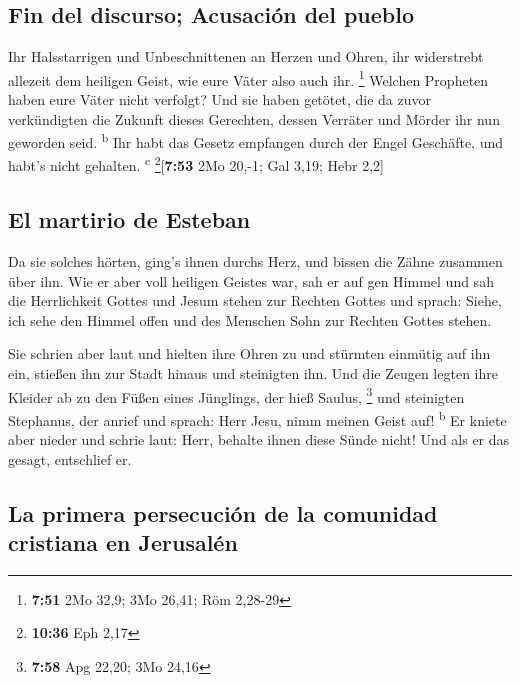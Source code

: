 \hypertarget{fin-del-discurso-acusaciuxf3n-del-pueblo}{%
\subsection{Fin del discurso; Acusación del
pueblo}\label{fin-del-discurso-acusaciuxf3n-del-pueblo}}

 Ihr Halsstarrigen und Unbeschnittenen an Herzen und
Ohren, ihr widerstrebt allezeit dem heiligen Geist, wie eure Väter also
auch ihr. \footnote{\textbf{7:51} 2Mo 32,9; 3Mo 26,41; Röm 2,28-29}
 Welchen Propheten haben eure Väter nicht verfolgt? Und
sie haben getötet, die da zuvor verkündigten die Zukunft dieses
Gerechten, dessen Verräter und Mörder ihr nun geworden seid.
\textsuperscript{b}  Ihr habt das Gesetz empfangen durch
der Engel Geschäfte, und habt's nicht gehalten. \textsuperscript{c}
\footnote{\textbf{10:36} Eph 2,17}{[}\textbf{7:53} 2Mo 20,-1; Gal 3,19;
Hebr 2,2{]}

\hypertarget{el-martirio-de-esteban}{%
\subsection{El martirio de Esteban}\label{el-martirio-de-esteban}}

 Da sie solches hörten, ging's ihnen durchs Herz, und
bissen die Zähne zusammen über ihn.  Wie er aber voll
heiligen Geistes war, sah er auf gen Himmel und sah die Herrlichkeit
Gottes und Jesum stehen zur Rechten Gottes  und sprach:
Siehe, ich sehe den Himmel offen und des Menschen Sohn zur Rechten
Gottes stehen.

 Sie schrien aber laut und hielten ihre Ohren zu und
stürmten einmütig auf ihn ein, stießen ihn zur Stadt hinaus und
steinigten ihn.  Und die Zeugen legten ihre Kleider ab zu
den Füßen eines Jünglings, der hieß Saulus, \footnote{\textbf{7:58} Apg
  22,20; 3Mo 24,16}  und steinigten Stephanus, der anrief
und sprach: Herr Jesu, nimm meinen Geist auf! \textsuperscript{b}
 Er kniete aber nieder und schrie laut: Herr, behalte
ihnen diese Sünde nicht! Und als er das gesagt, entschlief er.

\hypertarget{la-primera-persecuciuxf3n-de-la-comunidad-cristiana-en-jerusaluxe9n}{%
\subsection{La primera persecución de la comunidad cristiana en
Jerusalén}\label{la-primera-persecuciuxf3n-de-la-comunidad-cristiana-en-jerusaluxe9n}}

